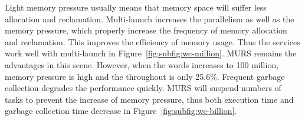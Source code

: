 Light memory pressure usually means that memory space will suffer less allocation and reclamation. Multi-launch increases the parallelism as well as the memory pressure, which properly increase the frequency of memory allocation and reclamation. This improves the efficiency of memory usage. Thus the services work well with multi-launch in Figure~\ref{fig:subfig:wc-million}. MURS remains the advantages in this scene. However, when the words increases to 100 million, memory pressure is high and the throughout is only 25.6\%. Frequent garbage collection degrades the performance quickly. MURS will suspend numbers of tasks to prevent the increase of memory pressure, thus both execution time and garbage collection time decrease in Figure~\ref{fig:subfig:wc-billion}.



















